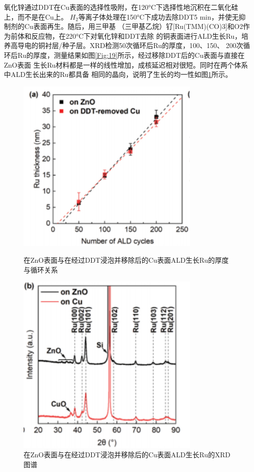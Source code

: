 \documentclass[UTF8,a4paper,12pt]{ctexart}%
\begin{document}
氧化锌通过DDT在Cu表面的选择性吸附，在120°C下选择性地沉积在二氧化硅上，而不是在Cu上。
$H_2$等离子体处理在150°C下成功去除DDT5 min，并使无抑制剂的Cu表面再生。随后，用三甲基
（三甲基乙烷）钌[Ru(TMM)(CO)3]和O2作为前体和反应物，在220°C下对氧化锌和DDT去除
的铜表面进行ALD生长Ru，培养高导电的铜衬层/种子层。XRD检测50次循环后Ru的厚度，100、150、
200次循环后Ru的厚度，测量结果如图\ref{Fig:19}所示，经过移除DDT后的Cu表面与直接在ZnO表面
生长Ru材料都是一样的线性增加，成核延迟相对很短。同时在两个体系中ALD生长出来的Ru都具备
相同的晶向，说明了生长的均一性如图\ref{Fig:20}所示。


\begin{figure}[htb]
	\centering
	\begin{minipage}[t]{0.5\textwidth}
	\centering
	\includegraphics[width=0.8\textwidth]{19.jpg}
	\caption{在ZnO表面与在经过DDT浸泡并移除后的Cu表面ALD生长Ru的厚度与循环关系}
	\label{Fig:19}
	\end{minipage}
	\begin{minipage}[t]{0.45\textwidth}
	\centering
	\includegraphics[width=0.8\textwidth]{20.jpg}
	\caption{在ZnO表面与在经过DDT浸泡并移除后的Cu表面ALD生长Ru的XRD图谱}
	\label{Fig:20}
	\end{minipage}
\end{figure}
\end{document}
